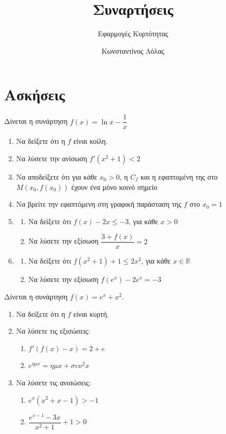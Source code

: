 \documentclass{presentation}
\title{Συναρτήσεις}
\subtitle{Εφαρμογές Κυρτότητας}
\author[Λόλας]{Κωνσταντίνος Λόλας}
\begin{document}
\begin{frame}
  \titlepage
\end{frame}

\section{Ασκήσεις}

\begin{askisi}
  Δίνεται η συνάρτηση $f(x)=\ln x-\dfrac{1}{x}$
  \begin{enumerate}[<+->]
    \item Να δείξετε ότι η $f$ είναι κοίλη.
    \item Να λύσετε την ανίσωση $f'(x^2+1)<2$
    \item Να αποδείξετε ότι για κάθε $x_0>0$, η $C_f$ και η εφαπτομένη της στο $Μ(x_0,f(x_0))$ έχουν ένα μόνο κοινό σημείο
    \item Να βρείτε την εφαπτόμενη στη γραφική παράσταση της $f$ στο $x_0=1$
    \item
          \begin{enumerate}[<+->]
            \item Να δείξετε ότι $f(x)-2x\le -3$, για κάθε $x>0$
            \item Να λύσετε την εξίσωση $\dfrac{3+f(x)}{x}=2$
          \end{enumerate}
    \item
          \begin{enumerate}[<+->]
            \item Να δείξετε ότι $f(x^2+1)+1 \le 2x^2$, για κάθε $x\in\mathbb{R}$
            \item Να λύσετε την εξίσωση $f(e^x)-2e^x=-3$
          \end{enumerate}
  \end{enumerate}
\end{askisi}

\begin{askisi}
  Δίνεται η συνάρτηση $f(x)=e^x+x^2$.
  \begin{enumerate}[<+->]
    \item Να δείξετε ότι η $f$ είναι κυρτή.
    \item Να λύσετε τις εξισώσεις:
          \begin{enumerate}[<+->]
            \item $f'(f(x)-x)=2+e$
            \item $e^{ημx}=ημx+συν^2x$
          \end{enumerate}
    \item Να λύσετε τις ανισώσεις:
          \begin{enumerate}[<+->]
            \item $e^x(x^2+x-1)>-1$
            \item $\dfrac{e^{x-1}-3x}{x^2+1}+1>0$
          \end{enumerate}
  \end{enumerate}
\end{askisi}
\end{document}
